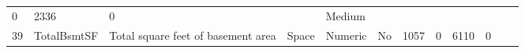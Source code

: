 \documentclass[11pt]{article}
\begin{document}
\begin{longtable}[]{@{}llllllllllll@{}}
\begin{minipage}[t]{0.04\columnwidth}
0\strut
\end{minipage} & \begin{minipage}[t]{0.04\columnwidth}\raggedright\strut
2336\strut
\end{minipage} & \begin{minipage}[t]{0.04\columnwidth}\raggedright\strut
0\strut
\end{minipage} & \begin{minipage}[t]{0.04\columnwidth}\raggedright\strut
\strut
\end{minipage} & \begin{minipage}[t]{0.04\columnwidth}\raggedright\strut
Medium\strut
\end{minipage}\tabularnewline
\begin{minipage}[t]{0.04\columnwidth}\raggedright\strut
39\strut
\end{minipage} & \begin{minipage}[t]{0.04\columnwidth}\raggedright\strut
TotalBsmtSF\strut
\end{minipage} & \begin{minipage}[t]{0.04\columnwidth}\raggedright\strut
Total square feet of basement area\strut
\end{minipage} & \begin{minipage}[t]{0.04\columnwidth}\raggedright\strut
Space\strut
\end{minipage} & \begin{minipage}[t]{0.04\columnwidth}\raggedright\strut
Numeric\strut
\end{minipage} & \begin{minipage}[t]{0.04\columnwidth}\raggedright\strut
No\strut
\end{minipage} & \begin{minipage}[t]{0.04\columnwidth}\raggedright\strut
1057\strut
\end{minipage} & \begin{minipage}[t]{0.04\columnwidth}\raggedright\strut
0\strut
\end{minipage} & \begin{minipage}[t]{0.04\columnwidth}\raggedright\strut
6110\strut
\end{minipage} & \begin{minipage}[t]{0.04\columnwidth}\raggedright\strut
0\strut
\end{minipage} & \begin{minipage}[t]{0.04\columnwidth}\raggedright\strut
\strut
\end{minipage} & \begin{minipage}[t]{0.04\columnwidth}\raggedright\strut

\end{minipage}
\end{longtable}
\end{document}
